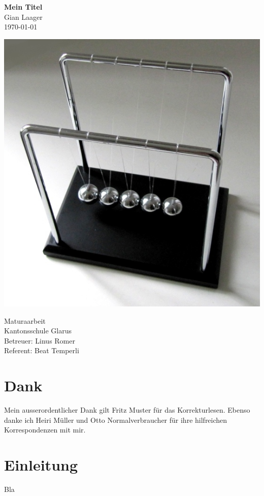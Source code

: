 \documentclass[11pt,DIV=10,final]{scrreprt} %
\begin{document}
\begin{titlepage}
\mbox{}\vspace{0.1\textheight}
\begin{center}
\textbf{\Huge Mein Titel}\\[3ex]
Gian Laager\\
\today
\vspace{0.05\textheight}
\begin{center}
	\includegraphics[width=.7\textwidth]{titelbild.jpg}
\end{center}
\vspace{0.05\textheight}
Maturaarbeit\\
Kantonsschule Glarus\\
Betreuer: Linus Romer\\
Referent: Beat Temperli
\end{center}
\end{titlepage}


\chapter*{Dank}
Mein ausserordentlicher Dank gilt Fritz Muster für das Korrekturlesen. Ebenso danke ich Heiri Müller und Otto Normalverbraucher für ihre hilfreichen Korrespondenzen mit mir.

\tableofcontents %

\chapter{Einleitung}  %
Bla
\end{document}
